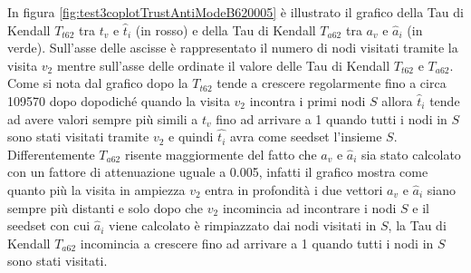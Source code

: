 In figura \ref{fig:test3coplotTrustAntiModeB620005} è illustrato il grafico della Tau di Kendall \(T_{t62}\) tra \(t_v\) e \(\hat{t}_i\) (in rosso)  e della Tau di Kendall \(T_{a62}\) tra \(a_v\) e \(\hat{a}_i\) (in verde). Sull'asse delle ascisse è rappresentato il numero di nodi visitati tramite la visita \(v_2\) mentre sull'asse delle ordinate il valore delle Tau di Kendall \(T_{t62}\) e \(T_{a62}\). Come si nota dal grafico dopo la \(T_{t62}\) tende a crescere regolarmente fino a circa 109570 dopo dopodiché quando la visita \(v_2\) incontra i primi nodi \(S\) allora \(\hat{t}_i\) tende ad avere valori sempre più simili a \(t_v\) fino ad arrivare a 1 quando tutti i nodi in \(S\) sono stati visitati tramite \(v_2\) e quindi \(\hat{t_i}\) avra come seedset l'insieme \(S\). Differentemente \(T_{a62}\) risente maggiormente del fatto che \(a_v\) e \(\hat{a}_i\) sia stato calcolato con un fattore di attenuazione uguale a 0.005, infatti il grafico mostra come quanto più la visita in ampiezza \(v_2\) entra in profondità i due vettori \(a_v\) e \(\hat{a}_i\) siano sempre più distanti e solo dopo che \(v_2\) incomincia ad incontrare i nodi \(S\) e il seedset con cui \(\hat{a}_i\) viene calcolato è rimpiazzato dai nodi visitati in \(S\), la Tau di Kendall \(T_{a62}\) incomincia a crescere fino ad arrivare a 1 quando tutti i nodi  in \(S\) sono stati visitati.





 

 
